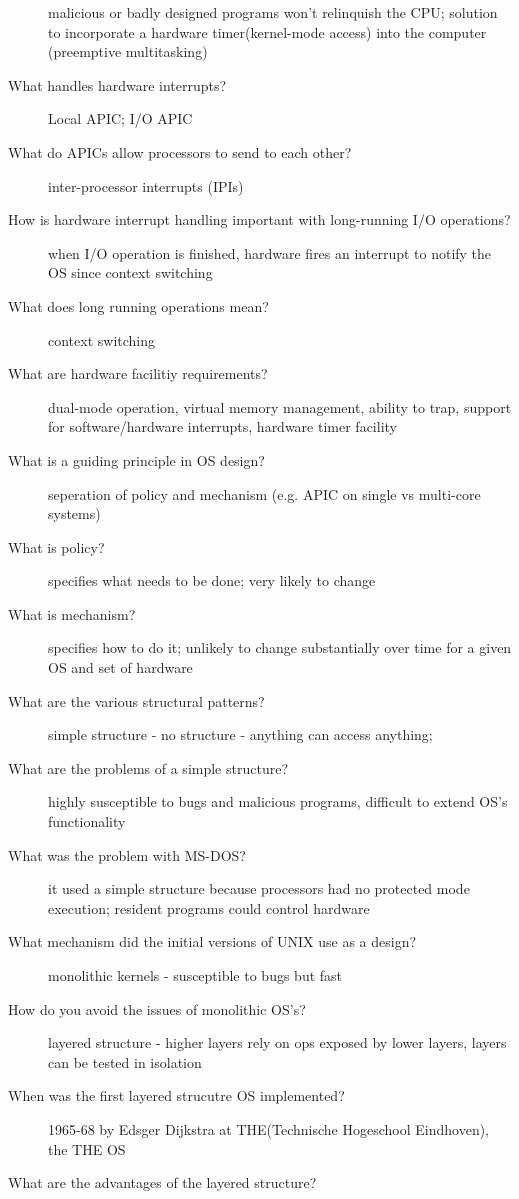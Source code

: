 \documentclass[10pt]{article}
\begin{document}
\begin{description}
  malicious or badly designed programs won't relinquish the CPU;
  solution to incorporate a hardware timer(kernel-mode access) into the computer (preemptive multitasking)
\item[What handles hardware interrupts?]
  Local APIC; I/O APIC
\item[What do APICs allow processors to send to each other?]
  inter-processor interrupts (IPIs)
\item[How is hardware interrupt handling important with long-running I/O operations?]
  when I/O operation is finished, hardware fires an interrupt to notify the OS since context switching
\item[What does long running operations mean?]
  context switching
\item[What are hardware facilitiy requirements?]
  dual-mode operation, virtual memory management, ability to trap, support for software/hardware interrupts, hardware timer facility
\item[What is a guiding principle in OS design?]
  seperation of policy and mechanism (e.g. APIC on single vs multi-core systems)
\item[What is policy?]
  specifies what needs to be done; very likely to change
\item[What is mechanism?]
  specifies how to do it; unlikely to change substantially over time for a given OS and set of hardware
\item[What are the various structural patterns?]
  simple structure - no structure - anything can access anything;
\item[What are the problems of a simple structure?]
  highly susceptible to bugs and malicious programs, difficult to extend OS's functionality
\item[What was the problem with MS-DOS?]
  it used a simple structure because processors had no protected mode execution;
  resident programs could control hardware
\item[What mechanism did the initial versions of UNIX use as a design?]
  monolithic kernels - susceptible to bugs but fast
\item[How do you avoid the issues of monolithic OS's?]
  layered structure - higher layers rely on ops exposed by lower layers, layers can be tested in isolation
\item[When was the first layered strucutre OS implemented?]
  1965-68 by Edsger Dijkstra at THE(Technische Hogeschool Eindhoven), the THE OS
\item[What are the advantages of the layered structure?]

\end{description}
\end{document}
